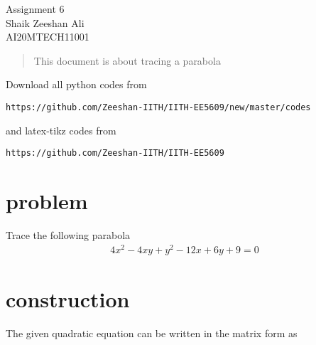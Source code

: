 \documentclass[journal,12pt,twocolumn]{IEEEtran}
\numberwithin{equation}{subsection}
\begin{document}
\begin{center}
\huge Assignment 6\\

\large Shaik Zeeshan Ali\\
\large AI20MTECH11001\\
\end{center}
\begin{abstract}
This document is about tracing a parabola
\end{abstract}
Download all python codes from 
\begin{lstlisting}
https://github.com/Zeeshan-IITH/IITH-EE5609/new/master/codes
\end{lstlisting}

and latex-tikz codes from 
\begin{lstlisting}
https://github.com/Zeeshan-IITH/IITH-EE5609
\end{lstlisting}
\section{problem}
Trace the following parabola
\begin{align}
    4x^2-4xy+y^2-12x+6y+9=0
\end{align}
\section{construction}
The given quadratic equation can be written in the matrix form as
\end{document}
